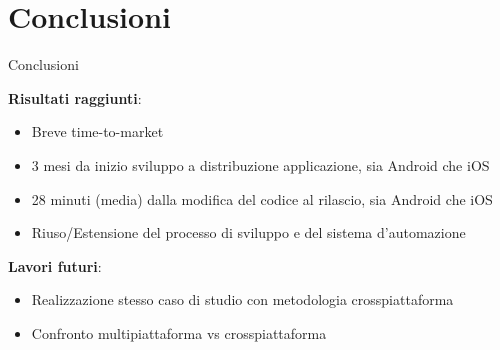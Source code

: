 
\section{Conclusioni}

\begin{frame}{Conclusioni}

    \textbf{Risultati raggiunti}:
    \begin{itemize}
        \item Breve time-to-market
        \item 3 mesi da inizio sviluppo a distribuzione applicazione, sia Android che iOS
        \item 28 minuti (media) dalla modifica del codice al rilascio, sia Android che iOS
        \item Riuso/Estensione del processo di sviluppo e del sistema d'automazione
    \end{itemize}

    \vspace{3mm}

    \textbf{Lavori futuri}:
    \begin{itemize}
        \item Realizzazione stesso caso di studio con metodologia crosspiattaforma
        \item Confronto multipiattaforma vs crosspiattaforma
    \end{itemize}
    
\end{frame}
